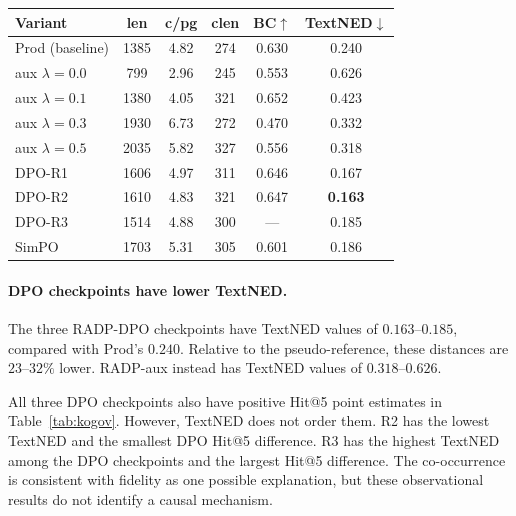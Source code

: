 \documentclass[11pt]{article}
\begin{document}
\begin{center}
\begin{minipage}{\columnwidth}
\centering\footnotesize
\captionsetup{hypcap=false}
\setlength{\tabcolsep}{2.5pt}
\begin{tabular}{lccccc}
\toprule
Variant & len & c/pg & clen & BC$\uparrow$ & TextNED$\downarrow$ \\
\midrule
Prod (baseline) & 1385 & 4.82 & 274 & 0.630 & 0.240 \\
aux $\lambda{=}0.0$ & 799 & 2.96 & 245 & 0.553 & 0.626 \\
aux $\lambda{=}0.1$ & 1380 & 4.05 & 321 & 0.652 & 0.423 \\
aux $\lambda{=}0.3$ & 1930 & 6.73 & 272 & 0.470 & 0.332 \\
aux $\lambda{=}0.5$ & 2035 & 5.82 & 327 & 0.556 & 0.318 \\
DPO-R1 & 1606 & 4.97 & 311 & 0.646 & 0.167 \\
DPO-R2 & 1610 & 4.83 & 321 & 0.647 & \textbf{0.163} \\
DPO-R3 & 1514 & 4.88 & 300 & --- & 0.185 \\
SimPO & 1703 & 5.31 & 305 & 0.601 & 0.186 \\
\bottomrule
\end{tabular}
\label{tab:mechanism}
\end{minipage}
\end{center}

\paragraph{DPO checkpoints have lower TextNED.} The three RADP-DPO checkpoints have TextNED values of $0.163$--$0.185$, compared with Prod's $0.240$. Relative to the pseudo-reference, these distances are $23$--$32\%$ lower. RADP-aux instead has TextNED values of $0.318$--$0.626$.

All three DPO checkpoints also have positive Hit@5 point estimates in Table~\ref{tab:kogov}. However, TextNED does not order them. R2 has the lowest TextNED and the smallest DPO Hit@5 difference. R3 has the highest TextNED among the DPO checkpoints and the largest Hit@5 difference. The co-occurrence is consistent with fidelity as one possible explanation, but these observational results do not identify a causal mechanism.
\end{document}

